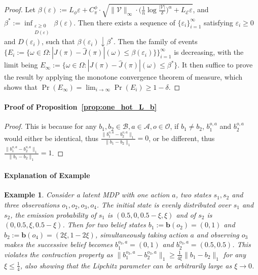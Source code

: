 \documentclass[twoside]{article}
\newtheorem{example}{Example}
\newcommand{\CAL}[1]{\mathcal{#1}}
\newcommand{\yplu}[1]{{\color{orange}{ [\textbf{Yiping:}} #1]}}
\begin{document}
\begin{proof}
    Let $\beta(\varepsilon):=L_\phi\varepsilon+ C_\pi^\phi\cdot \sqrt{\|\CAL{V}\|_\infty\cdot\bigg(\frac{1}{n}\log\frac{|\CAL{V}|}{\delta}\bigg)^\alpha+L_\CAL{E}\varepsilon}$, and $\beta^*:=\inf_{\substack{\varepsilon\geq 0\\D(\varepsilon)}}\beta(\varepsilon)$. Then there exists a sequence of $\{\varepsilon_i\}_{i=1}^\infty$ satisfying $\varepsilon_i\geq 0$ and $D(\varepsilon_i)$, such that $\beta(\varepsilon_i)\downarrow\beta^*$. Then the family of events $\{E_i:=\{\omega\in\Omega:|J(\pi)-\hat{J}(\pi)|(\omega)\leq \beta(\varepsilon_i)\}\}_{i=1}^\infty$ is decreasing, with the limit being $E_\infty:=\{\omega\in\Omega:|J(\pi)-\hat{J}(\pi)|(\omega)\leq \beta^*\}$. It then suffice to prove the result by applying the monotone convergence theorem of measure, which shows that $\Pr(E_\infty)=\lim_{i\to\infty}\Pr(E_i)\geq 1-\delta$.
\end{proof}
\paragraph{Proof of Proposition~\ref{prop:one_hot_L_b}}
\begin{proof}
    This is because for any $b_1,b_2\in\CAL{B}, a\in\CAL{A}, o\in\CAL{O}$, if $b_1\neq b_2$, $b_1^{o,a}$ and $b_2^{o,a}$ would either be identical, thus $\frac{\|b_1^{o,a}-b_2^{o,a}\|_1}{\|b_1-b_2\|_1}=0$, or be different, thus $\frac{\|b_1^{o,a}-b_2^{o,a}\|_1}{\|b_1-b_2\|_1}=1$.
\end{proof}

\paragraph{Explanation of Example}
\begin{example}\label{example:counter-exmp}
    Consider a latent MDP with one action $a$, two states $s_1,s_2$ and three observations $o_1,o_2,o_3,o_4$. The initial state is evenly distributed over $s_1$ and $s_2$, the emission probability of $s_1$ is $(0.5,0,0.5-\xi,\xi)$ and of $s_2$ is $(0,0.5,\xi,0.5-\xi)$. Then for two belief states $b_1:=\mathbf{b}(o_2)=(0,1)$ and $b_2:=\mathbf{b}(o_4)=(2\xi,1-2\xi)$, simultaneously taking action $a$ and observing $o_3$ makes the successive belief becomes $b_1^{o_3,a}=(0,1)$ and $b_2^{o_3,a}=(0.5,0.5)$. This violates the contraction property as $\|b_1^{o_3,a}-b_2^{o_3,a}\|_1\geq\frac{1}{4\xi}\|b_1-b_2\|_1$ for any $\xi\leq\frac{1}{4}$, also showing that the Lipchitz parameter can be arbitrarily large as $\xi\to 0$. 
\end{example} %
\end{document}
